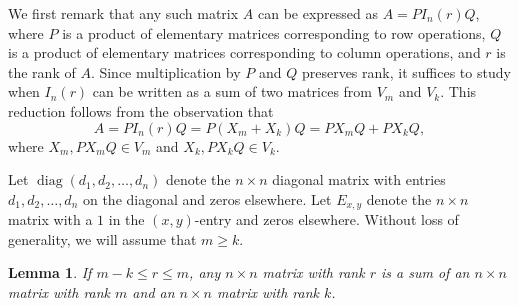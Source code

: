\documentclass[12pt, a4paper]{amsart}
\newtheorem{lem}[thm]{Lemma}
\theoremstyle{definition}
\numberwithin{equation}{section}
\DeclareMathOperator{\diag}{diag}
\begin{document}
We first remark that any such matrix \(A\) can be expressed as \(A = P I_n(r) Q\), where \(P\) is a product of elementary matrices corresponding to row operations, \(Q\) is a product of elementary matrices corresponding to column operations, and \(r\) is the rank of \(A\). Since multiplication by \(P\) and \(Q\) preserves rank, it suffices to study when \(I_n(r)\) can be written as a sum of two matrices from \(V_m\) and \(V_k\). This reduction follows from the observation that
\[
A = P I_n(r) Q = P(X_m + X_k)Q = P X_m Q + P X_k Q,
\]
where \(X_m, P X_m Q \in V_m\) and \(X_k, P X_k Q \in V_k\).

Let \(\diag(d_1, d_2, \ldots, d_n)\) denote the \(n \times n\) diagonal matrix with entries \(d_1, d_2, \ldots, d_n\) on the diagonal and zeros elsewhere. Let \(E_{x,y}\) denote the \(n \times n\) matrix with a \(1\) in the \((x,y)\)-entry and zeros elsewhere. Without loss of generality, we will assume that $m \geq k.$
\begin{lem} \label{lem:r<m}
    If $m-k \leq r \leq m$, any $n \times n$ matrix with rank $r$ is a sum of an $n \times n$ matrix with rank $m$ and an $n \times n$ matrix with rank $k$.
\end{lem}
\end{document}
